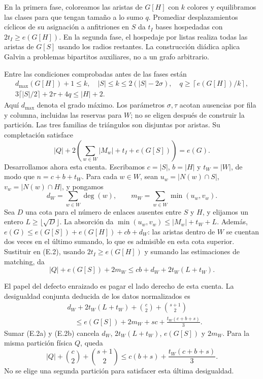 \documentclass[spanish,11pt,a4paper]{article}
\begin{document}
En la primera fase, coloreamos las aristas de \(G[H]\) con \(k\) colores y equilibramos las clases para que tengan tamaño a lo sumo \(q\). Promediar desplazamientos cíclicos de su asignación a anfitriones en \(S\) da \(t_I\) bases hospedadas con \(2t_I\ge e(G[H])\). En la segunda fase, el hospedaje por listas realiza todas las aristas de \(G[S]\) usando los radios restantes. La construcción diádica aplica Galvin a problemas bipartitos auxiliares, no a un grafo arbitrario.

Entre las condiciones comprobadas antes de las fases están \[
\begin{gathered}
d_{\max}(G[H])+1\le k,\quad |S|\le k\le2(|S|-2\sigma),\quad
q\ge\left\lceil e(G[H])/k\right\rceil,\\
3\lceil|S|/2\rceil+2\tau+4q\le |H|+2.
\end{gathered}
\tag{E.1}
\] Aquí \(d_{\max}\) denota el grado máximo. Los parámetros \(\sigma,\tau\) acotan ausencias por fila y columna, incluidas las reservas para \(W\); no se eligen después de construir la partición. Las tres familias de triángulos son disjuntas por aristas. Su completación satisface \[
|Q|+2\left(\sum_{w\in W}|M_w|+t_I+e(G[S])\right)=e(G).
\tag{E.2}
\] Desarrollamos ahora esta cuenta. Escribamos \(c=|S|\), \(b=|H|\) y \(t_W=|W|\), de modo que \(n=c+b+t_W\). Para cada \(w\in W\), sean \(u_w=|N(w)\cap S|\), \(v_w=|N(w)\cap H|\), y pongamos \[
d_W=\sum_{w\in W}\deg(w),\qquad
m_W=\sum_{w\in W}\min(u_w,v_w).
\] Sea \(D\) una cota para el número de enlaces ausentes entre \(S\) y \(H\), y elijamos un entero \(L\ge\lfloor\sqrt D\rfloor\). La absorción da \(\min(u_w,v_w)\le |M_w|+t_W+L\). Además, \(e(G)\le e(G[S])+e(G[H])+cb+d_W\): las aristas dentro de \(W\) se cuentan dos veces en el último sumando, lo que es admisible en esta cota superior. Sustituir en (E.2), usando \(2t_I\ge e(G[H])\) y sumando las estimaciones de matching, da \[
|Q|+e(G[S])+2m_W\le cb+d_W+2t_W(L+t_W).
\tag{E.2a}
\]

El papel del defecto enraizado es pagar el lado derecho de esta cuenta. La desigualdad conjunta deducida de los datos normalizados es \[
\begin{split}
&d_W+2t_W(L+t_W)+\binom c2+\binom{s+1}2\\
&\hspace{1em}\le e(G[S])+2m_W+sc+\frac{t_W(c+b+s)}3.
\end{split}
\tag{E.2b}
\] Sumar (E.2a) y (E.2b) cancela \(d_W\), \(2t_W(L+t_W)\), \(e(G[S])\) y \(2m_W\). Para la misma partición física \(Q\), queda \[
|Q|+\binom c2+\binom{s+1}2
\le c(b+s)+\frac{t_W(c+b+s)}3.
\tag{E.2c}
\] No se elige una segunda partición para satisfacer esta última desigualdad.
\end{document}
